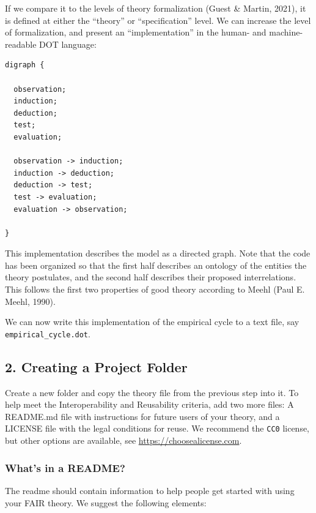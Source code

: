 \documentclass[
  man,floatsintext]{apa6}
\begin{document}
If we compare it to the levels of theory formalization (Guest \& Martin, 2021),
it is defined at either the ``theory'' or ``specification'' level.
We can increase the level of formalization, and present an ``implementation'' in the human- and machine-readable DOT language:

\begin{verbatim}
digraph {

  observation;
  induction;
  deduction;
  test;
  evaluation;
  
  observation -> induction;
  induction -> deduction;
  deduction -> test;
  test -> evaluation;
  evaluation -> observation;
  
}
\end{verbatim}

This implementation describes the model as a directed graph.
Note that the code has been organized so that the first half describes an ontology of the entities the theory postulates,
and the second half describes their proposed interrelations.
This follows the first two properties of good theory according to Meehl (Paul E. Meehl, 1990).

We can now write this implementation of the empirical cycle to a text file, say \texttt{empirical\_cycle.dot}.

\subsection{2. Creating a Project Folder}\label{creating-a-project-folder}

Create a new folder and copy the theory file from the previous step into it.
To help meet the Interoperability and Reusability criteria,
add two more files:
A README.md file with instructions for future users of your theory,
and a LICENSE file with the legal conditions for reuse.
We recommend the \texttt{CC0} license, but other options are available, see \href{https://choosealicense.com/non-software/}{https://choosealicense.com}.

\subsubsection{What's in a README?}\label{whats-in-a-readme}

The readme should contain information to help people get started with using your FAIR theory.
We suggest the following elements:
\end{document}
